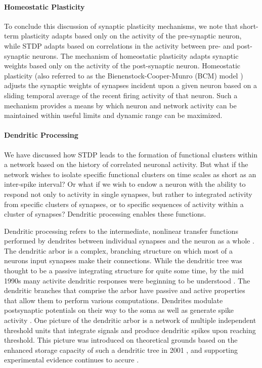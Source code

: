 \paragraph{Homeostatic Plasticity}
To conclude this discussion of synaptic plasticity mechanisms, we note that short-term plasticity adapts based only on the activity of the pre-synaptic neuron, while STDP adapts based on correlations in the activity between pre- and post-synaptic neurons. The mechanism of homeostatic plasticity \cite{cube2012} adapts synaptic weights based only on the activity of the post-synaptic neuron. Homeostatic plasticity (also referred to as the Bienenstock-Cooper-Munro (BCM) model \cite{bico1982}) adjusts the synaptic weights of synapses incident upon a given neuron based on a sliding temporal average of the recent firing activity of that neuron. Such a mechanism provides a means by which neuron and network activity can be maintained within useful limits and dynamic range can be maximized.

\paragraph{\label{sec:dendritic_processing}Dendritic Processing}
We have discussed how STDP leads to the formation of functional clusters within a network based on the history of correlated neuronal activity. But what if the network wishes to isolate specific functional clusters on time scales as short as an inter-spike interval? Or what if we wish to endow a neuron with the ability to respond not only to activity in single synapses, but rather to integrated activity from specific clusters of synapses, or to specific sequences of activity within a cluster of synapses? Dendritic processing enables these functions.

Dendritic processing refers to the intermediate, nonlinear transfer functions performed by dendrites between individual synapses and the neuron as a whole \cite{stsp2015}. The dendritic arbor is a complex, branching structure on which most of a neurons input synapses make their connections. While the dendritic tree was thought to be a passive integrating structure for quite some time, by the mid 1990s many activite dendritic responses were beginning to be understood \cite{joma1996}. The dendritic branches that comprise the arbor have passive and active properties that allow them to perform various computations. Dendrites modulate postsynaptic potentials on their way to the soma as well as generate spike activity \cite{majo2005,hoko2006}. One picture of the dendritic arbor is a network of multiple independent threshold units that integrate signals and produce dendritic spikes upon reaching threshold. This picture was introduced on theoretical grounds based on the enhanced storage capacity of such a dendritic tree in 2001 \cite{pome2001}, and supporting experimental evidence continues to accure \cite{sava2017}.


